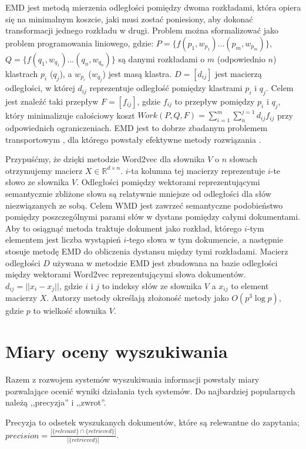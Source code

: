 \documentclass[pl]{minipw} %
\begin{document}
EMD jest metodą mierzenia odległości pomiędzy dwoma rozkładami, która opiera się na minimalnym koszcie, jaki musi zostać poniesiony, aby dokonać transformacji jednego rozkładu w drugi. Problem można sformalizować jako problem programowania liniowego, gdzie:
$P=\{f(p_1,w_{p_1})...(p_m,w_{p_m})\}$, $Q=\{f(q_1,w_{q_1})...(q_n,w_{q_n})\}$ są danymi rozkładami o $m$ (odpowiednio $n$) klastrach $p_i$ ($q_j$), a $w_{p_i}$ ($w_{q_j}$) jest masą klastra. $D=[d_{ij}]$ jest macierzą odległości, w której $d_{ij}$ reprezentuje odległość pomiędzy klastrami $p_i$ i $q_j$. Celem jest znaleźć taki przepływ $F = [f_{ij}]$, gdzie $f_{ij}$ to przepływ pomiędzy $p_i$ i $q_j$, który minimalizuje całościowy koszt $Work(P, Q, F) = \sum_{i=1}^{m}\sum_{n}^{j=1}d_{ij}f_{ij}$ przy odpowiednich ograniczeniach\cite{emd}.
EMD jest to dobrze zbadanym problemem transportowym \cite{emd}, dla którego powstały efektywne metody rozwiązania \cite{emd_method}. 

Przypuśćmy, że dzięki metodzie Word2vec dla słownika $V$ o $n$ słowach otrzymujemy macierz $X \in \mathbb{R}^{d \times n}$. $i$-ta kolumna tej macierzy reprezentuje $i$-te słowo ze słownika $V$. Odległości pomiędzy wektorami reprezentującymi semantycznie zbliżone słowa są relatywnie mniejsze od odległości dla słów niezwiązanych ze sobą. Celem WMD jest zawrzeć semantyczne podobieństwo pomiędzy poszczególnymi parami słów w dystans pomiędzy całymi dokumentami. Aby to osiągnąć metoda traktuje dokument jako rozkład, którego $i$-tym elementem jest liczba wystąpień $i$-tego słowa w tym dokumencie, a następnie stosuje metodę EMD do obliczenia dystansu między tymi rozkładami. Macierz odległości $D$ używana w metodzie EMD jest zbudowana na bazie odległości między wektorami Word2vec reprezentującymi słowa dokumentów. $d_{ij} = ||x_i-x_j||$, gdzie $i$ i $j$ to indeksy słów ze słownika $V$ a $x_{ij}$ to element macierzy $X$. Autorzy metody określają złożoność metody jako $O(p^3\log p)$, gdzie $p$ to wielkość słownika $V$.

\section{Miary oceny wyszukiwania}

Razem z rozwojem systemów wyszukiwania informacji powstały miary pozwalające ocenić wyniki działania tych systemów. Do najbardziej popularnych należą ,,precyzja'' i ,,zwrot''.

Precyzja to odsetek wyszukanych dokumentów, które są relewantne do zapytania; $precision=\frac{|\{relevant\} \cap \{retrieved\}|}{|\{retrieved\}|}$.
\end{document}
